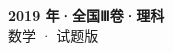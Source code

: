 \documentclass[zihao=-4, a4paper]{ctexart}
\begin{document}
\begin{center}
  {\Large\bfseries 2019 年·全国Ⅲ卷·理科}\\[4pt]
  {\large 数学 · 试题版}
\end{center}
\medskip
{}

\end{document}
